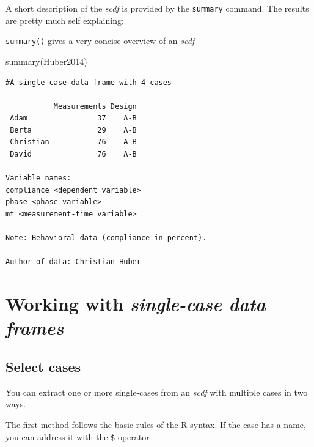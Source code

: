 \documentclass[
  letterpaper,
  DIV=11,
  numbers=noendperiod]{scrreprt}
\newenvironment{Shaded}{\begin{snugshade}}{\end{snugshade}}
\newcommand{\FunctionTok}[1]{\textcolor[rgb]{0.28,0.35,0.67}{#1}}
\newcommand{\NormalTok}[1]{\textcolor[rgb]{0.00,0.23,0.31}{#1}}
\newcommand{\SpecialCharTok}[1]{\textcolor[rgb]{0.37,0.37,0.37}{#1}}
\begin{document}
A short description of the \emph{scdf} is provided by the
\texttt{summary} command. The results are pretty much self explaining:

\texttt{summary()} gives a very concise overview of an \emph{scdf}

\begin{Shaded}
\begin{Highlighting}[]
\FunctionTok{summary}\NormalTok{(Huber2014)}
\end{Highlighting}
\end{Shaded}

\begin{verbatim}
#A single-case data frame with 4 cases

           Measurements Design
 Adam                37    A-B
 Berta               29    A-B
 Christian           76    A-B
 David               76    A-B

Variable names:
compliance <dependent variable>
phase <phase variable>
mt <measurement-time variable>

Note: Behavioral data (compliance in percent). 

Author of data: Christian Huber 
\end{verbatim}

\hypertarget{working-with-single-case-data-frames}{%
\chapter{\texorpdfstring{Working with \emph{single-case data
frames}}{Working with single-case data frames}}\label{working-with-single-case-data-frames}}

\hypertarget{sec-select-cases}{%
\section{Select cases}\label{sec-select-cases}}

You can extract one or more single-cases from an \emph{scdf} with
multiple cases in two ways.

The first method follows the basic rules of the R syntax. If the case
has a name, you can address it with the \texttt{\$} operator

\begin{Shaded}
\end{Shaded}
\end{document}
